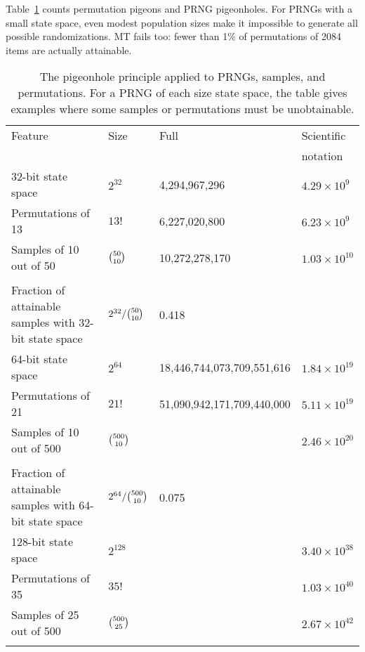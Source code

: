 \documentclass[graybox]{svmult}
\begin{document}
Table~\ref{tab:pigeonhole} counts permutation pigeons and PRNG pigeonholes.
For PRNGs with a small state space, even modest population sizes make it impossible to generate all possible randomizations.
MT fails too: fewer than 1\% of permutations of 2084 items are actually attainable.

\begin{table}
\caption{The pigeonhole principle applied to PRNGs, samples, and permutations.
For a PRNG of each size state space, the table gives examples where some samples or permutations 
must be unobtainable.}
\label{tab:pigeonhole}       
\begin{tabular}[h]{p{4.7cm}p{2.4cm}p{3.9cm}p{2cm}}
\hline\noalign{\smallskip}
Feature & Size & Full & Scientific \\
            &        &       & notation  \\
\noalign{\smallskip}\svhline\noalign{\smallskip}
32-bit state space & $2^{32}$ & 4,294,967,296 & $4.29 \times 10^9$ \\
Permutations of 13 & $13!$ & 6,227,020,800 & $6.23 \times 10^9$ \\
Samples of 10 out of 50 & $\tbinom{50}{10}$ &  10,272,278,170 & $1.03\times 10^{10} $ \\
{}\\
Fraction of attainable samples with 32-bit state space & ${2^{32}}/{\tbinom{50}{10}}$   & 0.418 & \\
\noalign{\smallskip}\svhline\noalign{\smallskip}
64-bit state space & $2^{64}$ & 18,446,744,073,709,551,616 & $1.84 \times 10^{19}$ \\
Permutations of 21 & $21!$ &  51,090,942,171,709,440,000 & $5.11 \times 10^{19}$ \\
Samples of 10 out of 500 & $\tbinom{500}{10}$ & & $2.46 \times 10^{20}$ \\
{}\\
Fraction of attainable samples with 64-bit state space & ${2^{64}}/{\tbinom{500}{10}}$ &  0.075 & \\
\noalign{\smallskip}\svhline\noalign{\smallskip}
128-bit state space & $2^{128}$ &  & $3.40 \times 10^{38}$ \\
Permutations of 35 & $35!$ &   & $1.03 \times 10^{40}$ \\
Samples of 25 out of 500 & $\tbinom{500}{25}$ & & $2.67 \times 10^{42}$ \\
{}\\

\end{tabular}
\end{table}
\end{document}
